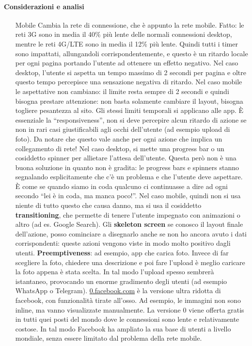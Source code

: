 \paragraph*{Considerazioni e analisi}
\begin{enumerate}

\item[Mobile] Cambia la rete di connessione, che \`e appunto la rete mobile. Fatto: le reti 3G sono in media il 40\% pi\`u lente delle normali connessioni desktop, mentre le reti 4G/LTE sono in media il 12\% pi\`u lente. Quindi tutti i timer sono impattati, allungandoli corrispondentemente, e questo \`e un ritardo locale per ogni pagina portando l'utente ad ottenere un effetto negativo. Nel caso desktop, l'utente si aspetta un tempo massimo di 2 secondi per pagina e oltre questo tempo percepisce una sensazione negativa di ritardo. Nel caso mobile le aspettative non cambiano: il limite resta sempre di 2 secondi e quindi bisogna prestare attenzione: non basta solamente cambiare il layout, bisogna togliere pesantezza al sito. Gli stessi limiti temporali si applicano alle app. \`E essenziale la ``responsiveness'', non si deve percepire alcun ritardo di azione se non in rari casi giustificabili agli occhi dell'utente (ad esempio upload di foto). Da notare che questo vale anche per ogni azione che implica un collegamento di rete! Nel caso desktop, si mette una progress bar o un cosiddetto spinner per allietare l'attesa dell'utente. Questa per\`o non \`e una buona soluzione in quanto non \`e gradita: le progress bars e spinners stanno segnalando esplicitamente che c'\`e un problema e che l'utente deve aspettare. \`E come se quando siamo in coda qualcuno ci continuasse a dire ad ogni secondo ``lei \`e in coda, ma manca poco!''. Nel caso mobile, quindi non si usa niente di tutto questo che causa danno, ma si usa il cosiddetto \textbf{transitioning}, che permette di tenere l'utente impegnato con animazioni o altro (ad es. Google Search). Gli \textbf{skeleton screen} se conosco il layout finale dell'azione, posso cominciare a disegnarlo anche se non ho ancora avuto i dati corrispondenti: queste azioni vengono viste in modo molto positivo dagli utenti.  \textbf{Preemptiveness}: ad esempio, app che carica foto. Invece di far scegliere la foto, chiedere una descrizione e poi fare l'upload \`e meglio caricare la foto appena \`e stata scelta. In tal modo l'upload spesso sembrer\`a istantaneo, provocando un enorme gradimento degli utenti (ad esempio WhatsApp o Telegram). \url{0.facebook.com} \`e la versione ultra ridotta di facebook, con funzionalit\`a tirate all'osso. Ad esempio, le immagini non sono inline, ma vanno visualizzate manualmente. La versione 0 viene offerta gratis in tutti quei posti del mondo dove le connessioni sono lente e relativamente costose. In tal modo Facebook ha ampliato la sua base di utenti a livello mondiale, senza essere limitato dal problema della rete mobile.


\end{enumerate}
